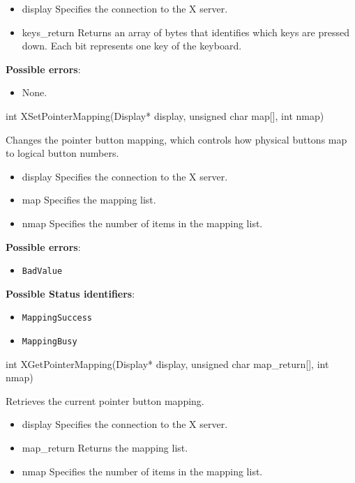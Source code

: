 \documentclass{report}
\begin{document}
\begin{itemize}
        \begin{itemize}
            \item display Specifies the connection to the X server.
            \item keys\_return Returns an array of bytes that identifies which keys are pressed down. Each bit represents one key of the keyboard.
        \end{itemize}

        \textbf{Possible errors}:
        \begin{itemize}
            \item None.
        \end{itemize}

        \begin{cppcode}
        int XSetPointerMapping(Display* display, unsigned char map[], int nmap)
        \end{cppcode}
        \bigbreak \noindent
        Changes the pointer button mapping, which controls how physical buttons map to logical button numbers.

        \begin{itemize}
            \item display Specifies the connection to the X server.
            \item map Specifies the mapping list.
            \item nmap Specifies the number of items in the mapping list.
        \end{itemize}

        \textbf{Possible errors}:
        \begin{itemize}
            \item \texttt{BadValue}
        \end{itemize}

        \textbf{Possible Status identifiers}:
        \begin{itemize}
            \item \texttt{MappingSuccess}
            \item \texttt{MappingBusy}
        \end{itemize}

        \begin{cppcode}
            int XGetPointerMapping(Display* display, unsigned char map_return[], int nmap)
        \end{cppcode}
        \bigbreak \noindent
        Retrieves the current pointer button mapping.

        \begin{itemize}
            \item display Specifies the connection to the X server.
            \item map\_return Returns the mapping list.
            \item nmap Specifies the number of items in the mapping list.
        \end{itemize}


\end{itemize}
\end{document}
